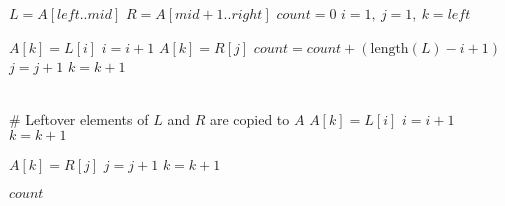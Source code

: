 \documentclass{article}
\begin{document}
\begin{enumerate}
\begin{enumerate}
\begin{algorithm}
\begin{algorithmic}[1]
                    \State $L = A[\mathit{left}..\mathit{mid}]$
                    \State $R = A[\mathit{mid}+1..\mathit{right}]$
                    \State $\mathit{count} = 0$
                    \State $i = 1,\ j = 1,\ k = \mathit{left}$ 
                    
        
                            \State $A[k] = L[i]$
                            \State $i = i + 1$
                        \Else
                            \State $A[k] = R[j]$
                            \State $\mathit{count} = \mathit{count} + (\text{length}(L) - i + 1)$
                            \State $j = j + 1$
                        \EndIf
                        \State $k = k + 1$
                    \EndWhile

                    \\ \# Leftover elements of $L$ and $R$ are copied to $A$
                        \State $A[k] = L[i]$
                        \State $i = i + 1$
                        \State $k = k + 1$
                    \EndWhile
        
                        \State $A[k] = R[j]$
                        \State $j = j + 1$
                        \State $k = k + 1$
                    \EndWhile
        
                    \State \Return $\mathit{count}$
                \EndFunction
            \end{algorithmic}
        \end{algorithm}
    \end{enumerate}

\end{enumerate}
\end{document}
